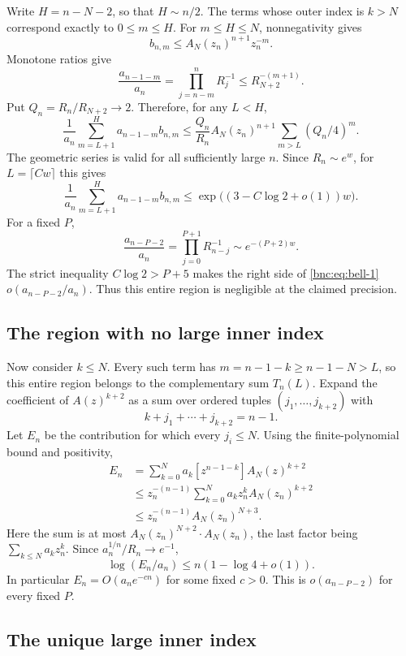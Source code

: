 \documentclass[11pt]{article}
\numberwithin{equation}{section}
\theoremstyle{definition}
\theoremstyle{remark}
\begin{document}
Write \(H=n-N-2\), so that \(H\sim n/2\).
The terms whose outer index is \(k>N\) correspond exactly to
\(0\le m\le H\).
For \(m\le H\le N\), nonnegativity gives
\[
 b_{n,m}\le A_N(z_n)^{n+1}z_n^{-m}.
\]
Monotone ratios give
\[
 \frac{a_{n-1-m}}{a_n}
 =\prod_{j=n-m}^{n}R_j^{-1}
 \le R_{N+2}^{-(m+1)}.
\]
Put \(Q_n=R_n/R_{N+2}\to2\).
Therefore, for any \(L<H\),
\[
 \frac1{a_n}
 \sum_{m=L+1}^{H}a_{n-1-m}b_{n,m}
 \le
 \frac{Q_n}{R_n}A_N(z_n)^{n+1}
       \sum_{m>L}(Q_n/4)^m.
\]
The geometric series is valid for all sufficiently large \(n\).
Since \(R_n\sim e^{w}\), for \(L=\lceil Cw\rceil\) this gives
\begin{equation}\label{bnc:eq:bell-1}
\frac1{a_n}
 \sum_{m=L+1}^{H}a_{n-1-m}b_{n,m}
 \le \exp\bigl((3-C\log2+o(1))w\bigr).
\end{equation}
For a fixed \(P\),
\[
 \frac{a_{n-P-2}}{a_n}
   =\prod_{j=0}^{P+1}R_{n-j}^{-1}
   \sim e^{-(P+2)w}.
\]
The strict inequality \(C\log2>P+5\) makes the right side of
\eqref{bnc:eq:bell-1} \(o(a_{n-P-2}/a_n)\).
Thus this entire region is negligible at the claimed precision.

\subsection{The region with no large inner index}

Now consider \(k\le N\).
Every such term has \(m=n-1-k\ge n-1-N>L\), so this entire
region belongs to the complementary sum \(T_n(L)\).
Expand the coefficient of \(A(z)^{k+2}\) as a sum over ordered tuples
\((j_1,\ldots,j_{k+2})\) with
\[
 k+j_1+\cdots+j_{k+2}=n-1.
\]
Let \(E_n\) be the contribution for which every \(j_i\le N\).
Using the finite-polynomial bound and positivity,
\[
 \begin{split}
 E_n
 &=\sum_{k=0}^{N}a_k[z^{n-1-k}]A_N(z)^{k+2}\\
 &\le z_n^{-(n-1)}
       \sum_{k=0}^{N}a_kz_n^kA_N(z_n)^{k+2}\\
 &\le z_n^{-(n-1)}A_N(z_n)^{N+3}.
 \end{split}
\]
Here the sum is at most \(A_N(z_n)^{N+2}\cdot A_N(z_n)\), the last factor being \(\sum_{k\le N}a_kz_n^k\).
Since \(a_n^{1/n}/R_n\to e^{-1}\),
\[
 \log(E_n/a_n)
 \le n(1-\log4+o(1)).
\]
In particular \(E_n=O(a_ne^{-cn})\) for some fixed \(c>0\).
This is \(o(a_{n-P-2})\) for every fixed \(P\).

\subsection{The unique large inner index}
\end{document}
